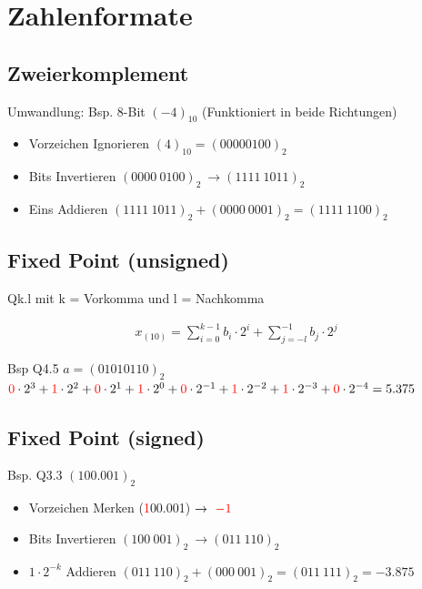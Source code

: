 \documentclass[10pt,a4paper]{article}
\begin{document}
\twocolumn
\pagestyle{fancy}
\section{Zahlenformate}
  \subsection{Zweierkomplement}
  Umwandlung: Bsp. 8-Bit $(-4)_{10}$ (Funktioniert in beide Richtungen)
  \begin{itemize}
      \item Vorzeichen Ignorieren $(4)_{10} = (0000 0100)_2$
      \item Bits Invertieren $(0000 \ 0100)_2 \ \rightarrow (1111\ 1011)_2$
      \item Eins Addieren $(1111\ 1011)_2 + (0000\ 0001)_2 = (1111\ 1100)_2$
  \end{itemize} 
  \subsection{Fixed Point (unsigned)}
Qk.l mit k = Vorkomma und l = Nachkomma
  \begin{mdframed}[style=exercise]
    \begin{align}
        x_{(10)} = \sum_{i=0}^{k-1} b_i\cdot 2^i + \sum_{j=-l}^{-1} b_j\cdot 2^j
    \end{align}
  \end{mdframed}
Bsp Q4.5 $a=(0101 0110)_2$ \\
$\textcolor{red}{0}\cdot 2^3+\textcolor{red}{1}\cdot 2^2+\textcolor{red}{0}\cdot 2^{1}+\textcolor{red}{1}\cdot 2^0+\textcolor{red}{0}\cdot 2^{-1}+\textcolor{red}{1}\cdot 2^{-2}+\textcolor{red}{1}\cdot 2^{-3}+\textcolor{red}{0}\cdot 2^{-4}=5.375$

  \subsection{Fixed Point (signed)}
Bsp. Q3.3 $(100.001)_2$ 
  \begin{itemize}
      \item Vorzeichen Merken (\textcolor{red}{1}00.001) $\rightarrow \ \textcolor{red}{-1}$
      \item Bits Invertieren $(100 \ 001)_2 \ \rightarrow (011\ 110)_2$
      \item $1\cdot 2^{-k}$ Addieren $(011\ 110)_2 + (000\ 001)_2 = (011\ 111)_2 = -3.875$
  \end{itemize} 
\end{document}

